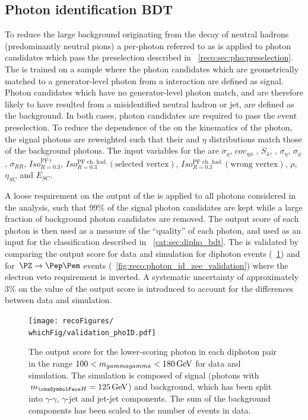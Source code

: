 \subsection{Photon identification BDT}
To reduce the large background originating from the decay of neutral hadrons (predominantly neutral pions) a per-photon \BDT referred to as \PhoIdBdt is applied to photon candidates which pass the preselection described in \Sec~\ref{reco:sec:pho:preselection}. The \PhoIdBdt is trained on a \gammaJet sample where the photon candidates which are geometrically matched to a generator-level photon from a \pp interaction are defined as signal. Photon candidates which have no generator-level photon match, and are therefore likely to have resulted from a misidentified neutral hadron or jet, are defined as the background. In both cases, photon candidates are required to pass the event preselection. To reduce the dependence of the \PhoIdBdt on the kinematics of the photon, the signal photons are reweighted such that their \pT and $\eta$ distributions match those of the background photons. The input variables for the \PhoIdBdt are $\sigma_{\eta}$, $cov_{\eta \phi}$ , $S_{4} $, \RNINE , $\sigma_{\eta} $, $\sigma_{\phi }$, $\sigma_{RR}$, $Iso^{\textrm{PF}\gamma}_{R=0.3}$, $Iso^{\textrm{PF ch. had.}}_{R=0.3}(\textrm{selected vertex})$, $Iso^{\textrm{PF ch. had.}}_{R=0.3}(\textrm{wrong vertex})$, $\rho$, $\eta_{SC}$ and $E_{SC}$. 

A loose requirement on the output of the \PhoIdBdt is applied to all photons considered in the analysis, such that 99\% of the signal photon candidates are kept while a large fraction of background photon candidates are removed. The \PhoIdBdt output score of each photon is then used as a measure of the ``quality'' of each photon, and used as an input for the classification \BDT described in \Sec~\ref{cat:sec:dipho_bdt}.
The \PhoIdBdt is validated by comparing the output score for data and simulation for diphoton events (\Fig~\ref{fig:reco:photon_id_score_hgg_bkg}) and for $\Zee$ events (\Fig~\ref{fig:reco:photon_id_zee_validation}) where the electron veto requirement is inverted. A systematic uncertainty of approximately $3\%$ on the value of the \PhoIdBdt output score is introduced to account for the differences between data and simulation.


\begin{figure}[hptb]
\centering 
\texttt{[image: recoFigures/\\whichFig/validation\_phoID.pdf]}
\caption{
The \PhoIdBdt output score for the lower-scoring photon in each diphoton pair in the range $100 < m_{gamma gamma} < 180\,\text{Ge\hspace{-.08em}V}$ for data and simulation. The simulation is composed of signal (\Hgg photons with $\mH=125\GeV$) and background, which has been split into $\gamma$-$\gamma$, $\gamma$-$\textrm{jet}$ and $\textrm{jet}$-$\textrm{jet}$ components. The sum of the background components has been scaled to the number of events in data.}
\label{fig:reco:photon_id_score_hgg_bkg}
\end{figure}

